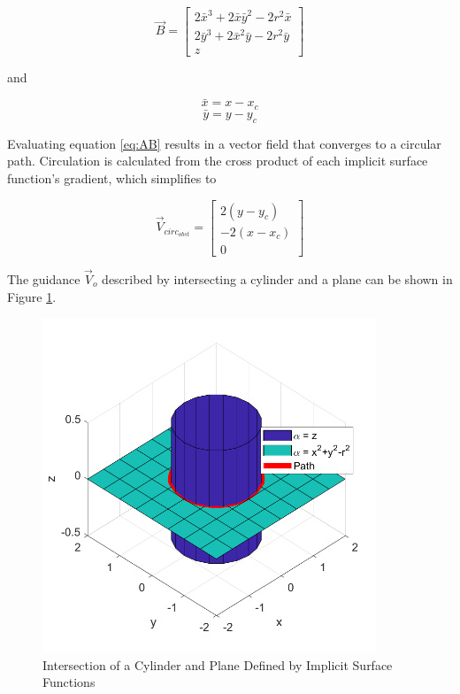 \documentclass[numbered,pdftex]{ohio-etd}
\begin{document}
\begin{equation}
\overrightarrow{B} = \begin{bmatrix} 2\bar{x}^3+2\bar{x}\bar{y}^2-2r^2\bar{x} \\ 2\bar{y}^3+2\bar{x}^2\bar{y}-2r^2\bar{y} \\z \end{bmatrix}
\end{equation}

\noindent
and


\begin{equation}
\bar{x} = x - x_c
\end{equation}
\begin{equation}
\bar{y} = y - y_c
\end{equation}


Evaluating equation \ref{eq:AB} results in a vector field that converges to a circular path. Circulation is calculated from the cross product of each implicit surface function's gradient, which simplifies to



\begin{equation}
\label{eq:vcirc_circle}
\overrightarrow{V}_{circ_{obst}} =  \begin{bmatrix}  2(y-y_c) \\[6pt] -2(x-x_c) \\[6pt] 0\end{bmatrix}
\end{equation}

The guidance $\overrightarrow{V}_o$ described by intersecting a cylinder and a plane can be shown in Figure \ref{fig:cylinderIntersection}. 

\begin{figure}[H]
	\centering
	\includegraphics[width=10cm]{Figures/cylinderIntersection}
	\caption{Intersection of a Cylinder and Plane Defined by Implicit Surface Functions}
	\label{fig:cylinderIntersection}
\end{figure}
\end{document}
